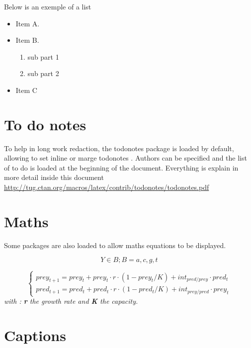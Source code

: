 \documentclass[12pt,a4paper,notitlepage,colorinlistoftodos]{article}
\begin{document}
Below is an exemple of a list

\begin{itemize}
  \item Item A.
  \item Item B.
  \begin{enumerate}
  	\item sub part 1
  	\item sub part 2
  \end{enumerate}
  \item Item C
\end{itemize}

\section{To do notes}

To help in long work redaction, the todonotes package is loaded by default, allowing to set inline or marge todonotes . Authors can be specified and the list of to do is loaded at the beginning of the document. Everything is explain in more detail inside this document \url{http://tug.ctan.org/macros/latex/contrib/todonotes/todonotes.pdf}


\section{Maths}

Some packages are also loaded to allow maths equations to be displayed.

\begin{equation}
Y \in B;  B = {a,c,g,t}
\label{eq:11}
\end{equation}

\begin{equation}
\begin{cases}
prey_{t+1} = prey_{t} + prey_{t} \cdot r \cdot (1 - prey_{t} / K ) + int_{pred/prey} \cdot pred_{t} \\
pred_{t+1} = pred_{t} + pred_{t} \cdot r \cdot (1 - pred_{t} / K ) + int_{prey/pred} \cdot prey_{t}
\end{cases}
\label{eq:lotk}
\end{equation}
\textit{with : \textbf{r} the growth rate and \textbf{K} the capacity.} \\

\section{Captions}
\end{document}
